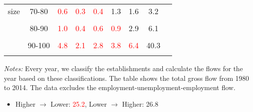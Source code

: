 \documentclass{beamer}
\begin{document}
{\begin{table}[t]
\begin{center}
\begin{tabular}{ccccccccc
        }
        size                                                     & 70-80                                     & \textcolor{red}{0.6} & \textcolor{red}{0.3} & \textcolor{red}{0.4} & 1.3                  & 1.6                  & 3.2      \\
                                                                 &                                           &                      &                      &                      &                      &                      &          \\
                                                                 & 80-90                                     & \textcolor{red}{1.0} & \textcolor{red}{0.4} & \textcolor{red}{0.6} & \textcolor{red}{0.9} & 2.9                  & 6.1      \\
                                                                 &                                           &                      &                      &                      &                      &                      &          \\
                                                                 & 90-100                                    & \textcolor{red}{4.8} & \textcolor{red}{2.1} & \textcolor{red}{2.8} & \textcolor{red}{3.8} & \textcolor{red}{6.4} & 40.3     \\
        \\\hline
      \end{tabular}
    \end{center}
    \vspace{0.05in}
    \footnotesize{\tiny\textit{Notes:} Every year, we classify the establishments and calculate the flows for the year based on these classifications. The table shows the total gross flow from 1980 to 2014. The data excludes the employment-unemployment-employment flow.}
  \end{table}
  \begin{itemize}
    \item Higher $\rightarrow$ Lower: \textcolor{red}{25.2}, Lower $\rightarrow$ Higher: 26.8
  \end{itemize}
}
\end{document}
